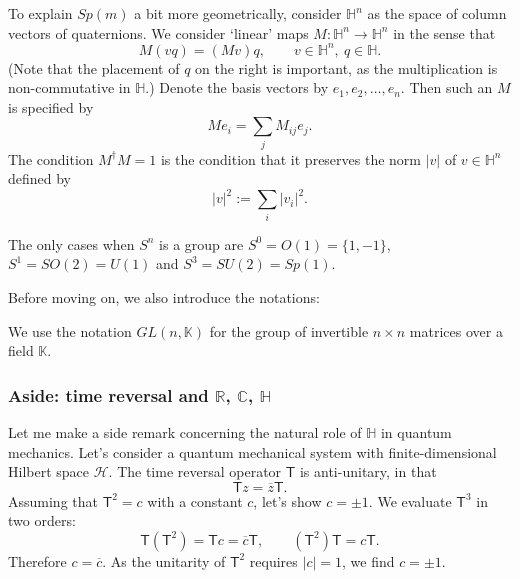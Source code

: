\documentclass[12pt]{article}
\numberwithin{equation}{section}
\theoremstyle{remark}
\def\bC{\mathbb{C}}
\def\bH{\mathbb{H}}
\def\bK{\mathbb{K}}
\def\bR{\mathbb{R}}
\def\cH{\mathcal{H}}
\def\sT{\mathsf{T}}
\begin{document}
To explain $Sp(m)$ a bit more geometrically, consider $\bH^n$
as the space of column vectors of quaternions. 
We consider `linear' maps  $M:\bH^n\to \bH^n$ in the sense that
\begin{equation}
M (vq) = (Mv) q, \qquad v\in \bH^n,\ q\in \bH.
\end{equation} 
(Note that the placement of $q$ on the right is important, 
as the multiplication is non-commutative in $\bH$.)
Denote the basis vectors by $e_1,e_2,\ldots,e_n$.
Then such an $M$ is specified by \begin{equation}
M e_i = \sum_j M_{ij} e_j.
\end{equation}
The condition $M^\dagger M=1$ is the condition that it preserves the norm $|v|$ of $v\in \bH^n$
defined by \begin{equation}
  |v|^2 := \sum_i |v_i|^2.
\end{equation}

\begin{fact}
  The only cases when $S^n$ is a group are $S^0=O(1)=\{1,-1\}$, $S^1=SO(2)=U(1)$
  and $S^3=SU(2)=Sp(1)$.
\end{fact}

Before moving on,
we also introduce the notations:
\begin{definition}
We use the notation $GL(n,\bK)$ for the group of invertible $n\times n$ matrices over a field $\bK$.
\end{definition}

\subsubsection{Aside: time reversal and $\bR$, $\bC$, $\bH$}

Let me make a side remark concerning the natural role of $\bH$ in quantum mechanics.
Let's consider a quantum mechanical system with finite-dimensional Hilbert space $\cH$.
The time reversal operator $\sT$ is anti-unitary, in that 
\begin{equation}
  \sT z = \overline z \sT.
\end{equation}
Assuming that $\sT^2=c$ with a constant $c$, let's show $c=\pm1$. We evaluate $\sT^3$ in two orders:
\begin{equation}
\sT(\sT^2)= \sT c = \overline{c}\sT,\qquad
(\sT^2)\sT = c\sT.
\end{equation} Therefore $c=\overline{c}$. As the unitarity of $\sT^2$ requires $|c|=1$,
 we find $c=\pm 1$.
\end{document}
